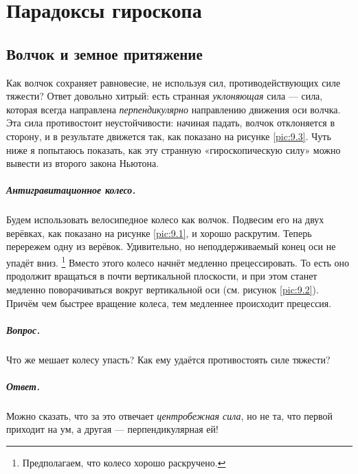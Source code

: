 \chapter{Парадоксы гироскопа}

\section{Волчок и земное притяжение}

Как волчок сохраняет равновесие, не используя сил, противодействующих силе тяжести?
Ответ довольно хитрый: есть странная \emph{уклоняющая} сила --- сила, которая всегда направлена \emph{перпендикулярно} направлению движения оси волчка.
Эта сила противостоит неустойчивости: начиная падать, волчок отклоняется в сторону, и в результате движется так, как показано на рисунке \ref{pic:9.3}.
Чуть ниже я попытаюсь показать, как эту странную «гироскопическую силу» можно вывести из второго закона Ньютона.


\paragraph{Антигравитационное колесо.}\label{Антигравитационное велоколесо}
Будем использовать велосипедное колесо как волчок.
Подвесим его на двух верёвках, как показано на рисунке \ref{pic:9.1}, и хорошо раскрутим.
Теперь перережем одну из верёвок.
Удивительно, но неподдерживаемый конец оси не упадёт вниз.%
\footnote{Предполагаем, что колесо хорошо раскручено.}
Вместо этого колесо начнёт медленно прецессировать.
То есть оно продолжит вращаться в почти вертикальной плоскости, и при этом станет медленно поворачиваться вокруг вертикальной оси (см. рисунок \ref{pic:9.2}).
Причём чем быстрее вращение колеса, тем медленнее происходит прецессия.

\paragraph{Вопрос.}
Что же мешает колесу упасть?
Как ему удаётся противостоять силе тяжести?


\paragraph{Ответ.}
\label{Антигравитационное велоколесо:Ответ}
Можно сказать, что за это отвечает \emph{центробежная сила}, но не та, что первой приходит на ум, а другая --- перпендикулярная ей!

